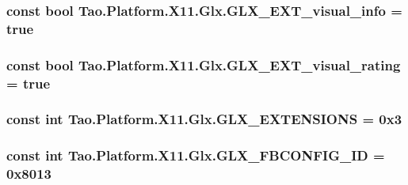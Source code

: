 \label{class_tao_1_1_platform_1_1_x11_1_1_glx_abec2a3b7c5910903cdfca72d15e02d22}
\hypertarget{class_tao_1_1_platform_1_1_x11_1_1_glx_af37f74af4723886fda0cbc536bb75f8c}{
\subsubsection[{GLX\_\-EXT\_\-visual\_\-info}]{\setlength{\rightskip}{0pt plus 5cm}const bool {\bf Tao.Platform.X11.Glx.GLX\_\-EXT\_\-visual\_\-info} = true}}
\label{class_tao_1_1_platform_1_1_x11_1_1_glx_af37f74af4723886fda0cbc536bb75f8c}
\hypertarget{class_tao_1_1_platform_1_1_x11_1_1_glx_ae700b9e1b0c2d6641015ff34403ee28f}{
\subsubsection[{GLX\_\-EXT\_\-visual\_\-rating}]{\setlength{\rightskip}{0pt plus 5cm}const bool {\bf Tao.Platform.X11.Glx.GLX\_\-EXT\_\-visual\_\-rating} = true}}
\label{class_tao_1_1_platform_1_1_x11_1_1_glx_ae700b9e1b0c2d6641015ff34403ee28f}
\hypertarget{class_tao_1_1_platform_1_1_x11_1_1_glx_aa98e7ad8e8c05de7ed45f2578b86b280}{
\subsubsection[{GLX\_\-EXTENSIONS}]{\setlength{\rightskip}{0pt plus 5cm}const int {\bf Tao.Platform.X11.Glx.GLX\_\-EXTENSIONS} = 0x3}}
\label{class_tao_1_1_platform_1_1_x11_1_1_glx_aa98e7ad8e8c05de7ed45f2578b86b280}
\hypertarget{class_tao_1_1_platform_1_1_x11_1_1_glx_a9058319d3f2837e9c43e7822f0ce1f53}{
\subsubsection[{GLX\_\-FBCONFIG\_\-ID}]{\setlength{\rightskip}{0pt plus 5cm}const int {\bf Tao.Platform.X11.Glx.GLX\_\-FBCONFIG\_\-ID} = 0x8013}}
